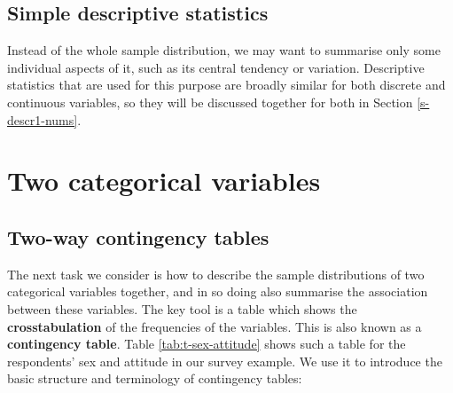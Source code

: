 \documentclass[11pt,a4paper,openany]{book}
\begin{document}
\subsection{Simple descriptive
statistics}\label{ss-descr1-1cat-descriptives}

Instead of the whole sample distribution, we may want to summarise only
some individual aspects of it, such as its central tendency or
variation. Descriptive statistics that are used for this purpose are
broadly similar for both discrete and continuous variables, so they will
be discussed together for both in Section \ref{s-descr1-nums}.

\section{Two categorical variables}\label{s-descr1-2cat}

\subsection{Two-way contingency tables}\label{ss-descr1-2cat-tables}

The next task we consider is how to describe the sample distributions of
two categorical variables together, and in so doing also summarise the
association between these variables. The key tool is a table which shows
the \textbf{crosstabulation} of the frequencies of the variables. This
is also known as a \textbf{contingency table}. Table
\ref{tab:t-sex-attitude} shows such a table for the respondents' sex and
attitude in our survey example. We use it to introduce the basic
structure and terminology of contingency tables:
\end{document}
